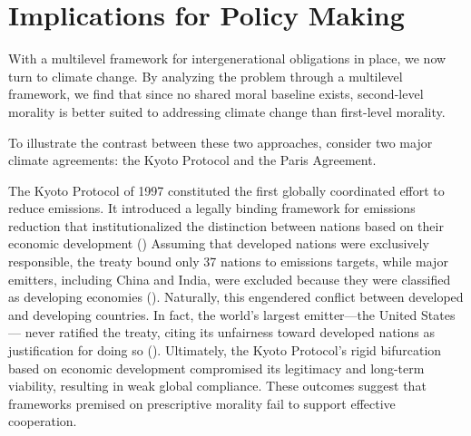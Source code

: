 \documentclass[12pt, a4paper, twoside]{article}
\begin{document}
\section{Implications for Policy Making}

With a multilevel framework for intergenerational obligations in place, we now turn to climate change. By analyzing the problem through a multilevel framework, we find that since no shared moral baseline exists, second-level morality is better suited to addressing climate change than first-level morality.

To illustrate the contrast between these two approaches, consider two major climate agreements: the Kyoto Protocol and the Paris Agreement.

The Kyoto Protocol of 1997 constituted the first globally coordinated effort to reduce emissions. It introduced a legally binding framework for emissions reduction that institutionalized the distinction between nations based on their economic development (\cite[p.\ 24]{maslin-nodate}) Assuming that developed nations were exclusively responsible, the treaty bound only 37 nations to emissions targets, while major emitters, including China and India, were excluded because they were classified as developing economies (\cite{unfccc2025kyoto}). Naturally, this engendered conflict between developed and developing countries. In fact, the world’s largest emitter—the United States— never ratified the treaty, citing its unfairness toward developed nations as justification for doing so (\cite{mignone2007}). Ultimately, the Kyoto Protocol’s rigid bifurcation based on economic development compromised its legitimacy and long-term viability, resulting in weak global compliance. These outcomes suggest that frameworks premised on prescriptive morality fail to support effective cooperation.
\end{document}
